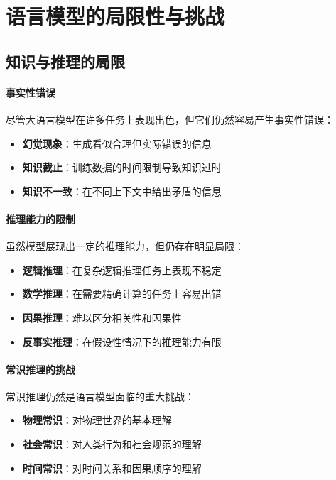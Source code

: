 \section{语言模型的局限性与挑战}

\subsection{知识与推理的局限}

\paragraph{事实性错误}
尽管大语言模型在许多任务上表现出色，但它们仍然容易产生事实性错误：

\begin{itemize}
\item \textbf{幻觉现象}：生成看似合理但实际错误的信息
\item \textbf{知识截止}：训练数据的时间限制导致知识过时
\item \textbf{知识不一致}：在不同上下文中给出矛盾的信息
\end{itemize}

\paragraph{推理能力的限制}
虽然模型展现出一定的推理能力，但仍存在明显局限：

\begin{itemize}
\item \textbf{逻辑推理}：在复杂逻辑推理任务上表现不稳定
\item \textbf{数学推理}：在需要精确计算的任务上容易出错
\item \textbf{因果推理}：难以区分相关性和因果性
\item \textbf{反事实推理}：在假设性情况下的推理能力有限
\end{itemize}

\paragraph{常识推理的挑战}
常识推理仍然是语言模型面临的重大挑战：

\begin{itemize}
\item \textbf{物理常识}：对物理世界的基本理解
\item \textbf{社会常识}：对人类行为和社会规范的理解
\item \textbf{时间常识}：对时间关系和因果顺序的理解
\end{itemize}

